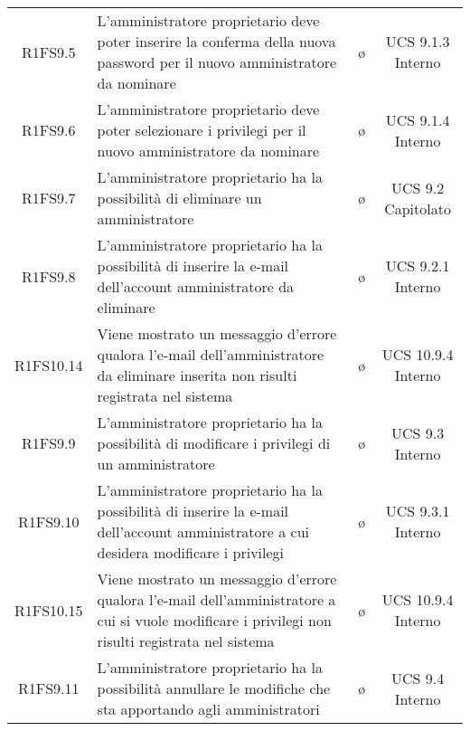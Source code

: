 {\begin{longtable}{ c C{4cm} c c}
R1FS9.5 & L'amministratore proprietario deve poter inserire la conferma della nuova password per il nuovo amministratore da nominare & \o & UCS 9.1.3 Interno\\

R1FS9.6 & L'amministratore proprietario deve poter selezionare i privilegi per il nuovo amministratore da nominare & \o & UCS 9.1.4 Interno\\

R1FS9.7 & L'amministratore proprietario ha la possibilità di eliminare un amministratore & \o & UCS 9.2 Capitolato\\

R1FS9.8 & L'amministratore proprietario ha la possibilità di inserire la e-mail dell'account amministratore da eliminare & \o & UCS 9.2.1 Interno\\

R1FS10.14 & Viene mostrato un messaggio d'errore qualora l'e-mail dell'amministratore da eliminare inserita non risulti registrata nel sistema & \o & UCS 10.9.4 Interno\\

R1FS9.9 & L'amministratore proprietario ha la possibilità di modificare i privilegi di un amministratore & \o & UCS 9.3 Interno\\

R1FS9.10 & L'amministratore proprietario ha la possibilità di inserire la e-mail dell'account amministratore a cui desidera modificare i privilegi & \o & UCS 9.3.1 Interno\\

R1FS10.15 & Viene mostrato un messaggio d'errore qualora l'e-mail dell'amministratore a cui si vuole modificare i privilegi non risulti registrata nel sistema & \o & UCS 10.9.4 Interno\\

R1FS9.11 & L'amministratore proprietario ha la possibilità annullare le modifiche che sta apportando agli amministratori & \o & UCS 9.4 Interno\\

\end{longtable}
}